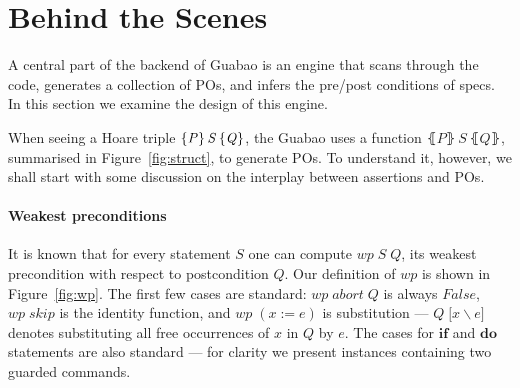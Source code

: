 \documentclass[runningheads]{llncs}
\newcommand{\Conid}[1]{\mathit{#1}}
\newcommand{\Varid}[1]{\mathit{#1}}
\let\Varid\mathit
\let\Conid\mathit
\begin{document}

\section{Behind the Scenes}

A central part of the backend of Guabao is an engine that scans through the code, generates a collection of POs, and infers the pre/post conditions of specs.
In this section we examine the design of this engine.

When seeing a Hoare triple \ensuremath{\htriple{\Conid{P}}{\Conid{S}}{\Conid{Q}}}, the Guabao uses a function \ensuremath{\lBrace\Conid{P}\rBrace\,\Conid{S}\,\lBrace\Conid{Q}\rBrace}, summarised in Figure~\ref{fig:struct}, to generate POs.
To understand it, however, we shall start with some discussion on the interplay between assertions and POs.

\paragraph{Weakest preconditions}
It is known that for every statement \ensuremath{\Conid{S}} one can compute \ensuremath{\Varid{wp}\;\Conid{S}\;\Conid{Q}}, its weakest precondition with respect to postcondition \ensuremath{\Conid{Q}}.
Our definition of \ensuremath{\Varid{wp}} is shown in Figure~\ref{fig:wp}.
The first few cases are standard: \ensuremath{\Varid{wp}\;\Varid{abort}\;\Conid{Q}} is always \ensuremath{\Conid{False}}, \ensuremath{\Varid{wp}\;\Varid{skip}} is the identity function, and \ensuremath{\Varid{wp}\;(\Varid{x}\mathbin{:=}\Varid{e})} is substitution --- \ensuremath{\Conid{Q}\;\lbrack\Varid{x}\backslash\Varid{e}\rbrack} denotes substituting all free occurrences of \ensuremath{\Varid{x}} in \ensuremath{\Conid{Q}} by \ensuremath{\Varid{e}}.
The cases for \ensuremath{\mathbf{if}} and \ensuremath{\mathbf{do}} statements are also standard --- for clarity we present instances containing two guarded commands.
\end{document}
